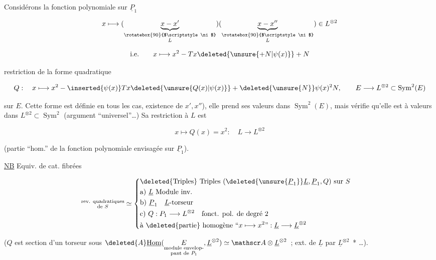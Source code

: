 
Considérons la fonction polynomiale sur $\underline P_1$

\[
x\longmapsto (\underbrace{x-x'}_{\substack{\rotatebox{90}{$\scriptstyle\ni$}\\ L}})(\underbrace{x-x''}_{\substack{\rotatebox{90}{$\scriptstyle\ni$}\\ L}})\in L^{\otimes 2}
\]

\[
\text{i.e.}\qquad x\longmapsto x^2-Tx\deleted{\unsure{+N|\psi(x)}}+N
\]

restriction de la forme quadratique

\[
Q:\quad x\longmapsto x^2-\inserted{\psi(x)}Tx\deleted{\unsure{Q(x)|\psi(x)}}+\deleted{\unsure{N}}\psi(x)^2N,\qquad E\longrightarrow L^{\otimes 2}\subset\operatorname{Sym}^2(E)
\]

sur $E$. Cette forme est définie  en tous les cas,  existence de $x',x''$), elle prend ses valeurs dans $\operatorname{Sym}^2(E)$, mais  vérifie qu'elle est à valeurs dans $L^{\otimes 2}\subset\operatorname{Sym}^2$ (argument ``universel''\ldots) Sa restriction à $L$ est

\[
x\longmapsto Q(x)=x^2:\quad L\longrightarrow L^{\otimes 2}
\]

(partie ``hom.'' de la fonction polynomiale  envisagée sur $\underline P_1$).

\uline{NB} Equiv. de cat. fibrées

\[
\begin{aligned}
\substack{\text{rev. quadratiques}\\\text{de } S}
&\simeq\left\{\begin{aligned}
&\deleted{\text{Triples}}\ \text{Triples }(\deleted{\unsure{\underline P_1}}\underline L,\underline P_1,Q)\text{ sur }S\\
&\text{a) }\underline L\ \text{Module inv.}\\
&\text{b) }\underline P_1\quad \underline L\text{-torseur}\\
&\text{c) }Q:P_1\longrightarrow L^{\otimes 2}\quad\text{fonct. pol. de degré }2\\
&\text{à }\deleted{\text{partie}}\text{ homogène ``}x\longmapsto x^2\text{''}:\underline L\longrightarrow\underline L^{\otimes 2}
\end{aligned}\right.
\end{aligned}
\]

($Q$ est section d'un torseur sous $\deleted{A}\underline{\operatorname{Hom}}(\underset{\substack{\text{module envelop-}\\\text{pant de }P_1}}{E},\underline L^{\otimes 2})\simeq\mathscr A\otimes\underline L^{\otimes 2}$~; ext. de $\underline L$ par $\underline L^{\otimes 2}$~* \ldots).

